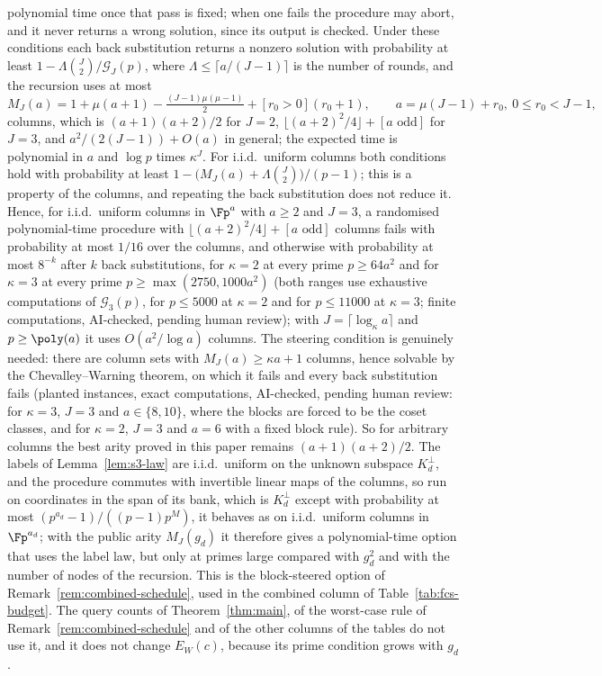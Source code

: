 \begin{remark}
polynomial time once that pass is fixed; when one fails the procedure may abort, and it never returns a wrong solution, since its output is checked. Under these conditions each back substitution returns a nonzero solution with probability at least $1-\Lambda\binom{J}{2}/\mathcal{G}_J(p)$, where $\Lambda\le\lceil a/(J-1)\rceil$ is the number of rounds, and the recursion uses at most
\[
  M_J(a)=1+\mu(a+1)-\tfrac{(J-1)\mu(\mu-1)}{2}+[r_0>0](r_0+1),\qquad a=\mu(J-1)+r_0,\ 0\le r_0<J-1,
\]
columns, which is $(a+1)(a+2)/2$ for $J=2$, $\lfloor(a+2)^2/4\rfloor+[a\text{ odd}]$ for $J=3$, and $a^2/(2(J-1))+O(a)$ in general; the expected time is polynomial in $a$ and $\log p$ times $\kappa^J$. For i.i.d.\ uniform columns both conditions hold with probability at least $1-\bigl(M_J(a)+\Lambda\binom{J}{2}\bigr)/(p-1)$; this is a property of the columns, and repeating the back substitution does not reduce it. Hence, for i.i.d.\ uniform columns in $\Fp^a$ with $a\ge2$ and $J=3$, a randomised polynomial-time procedure with $\lfloor(a+2)^2/4\rfloor+[a\text{ odd}]$ columns fails with probability at most $1/16$ over the columns, and otherwise with probability at most $8^{-k}$ after $k$ back substitutions, for $\kappa=2$ at every prime $p\ge64a^2$ and for $\kappa=3$ at every prime $p\ge\max(2750,1000a^2)$ (both ranges use exhaustive computations of $\mathcal{G}_3(p)$, for $p\le5000$ at $\kappa=2$ and for $p\le11000$ at $\kappa=3$; finite computations, AI-checked, pending human review); with $J=\lceil\log_\kappa a\rceil$ and $p\ge\poly(a)$ it uses $O(a^2/\log a)$ columns. The steering condition is genuinely needed: there are column sets with $M_J(a)\ge\kappa a+1$ columns, hence solvable by the Chevalley--Warning theorem, on which it fails and every back substitution fails (planted instances, exact computations, AI-checked, pending human review: for $\kappa=3$, $J=3$ and $a\in\{8,10\}$, where the blocks are forced to be the coset classes, and for $\kappa=2$, $J=3$ and $a=6$ with a fixed block rule). So for arbitrary columns the best arity proved in this paper remains $(a+1)(a+2)/2$. The labels of Lemma~\ref{lem:s3-law} are i.i.d.\ uniform on the unknown subspace $K_d^\perp$, and the procedure commutes with invertible linear maps of the columns, so run on coordinates in the span of its bank, which is $K_d^\perp$ except with probability at most $(p^{a_d}-1)/((p-1)p^{M})$, it behaves as on i.i.d.\ uniform columns in $\Fp^{a_d}$; with the public arity $M_J(g_d)$ it therefore gives a polynomial-time option that uses the label law, but only at primes large compared with $g_d^2$ and with the number of nodes of the recursion. This is the block-steered option of Remark~\ref{rem:combined-schedule}, used in the combined column of Table~\ref{tab:fcs-budget}. The query counts of Theorem~\ref{thm:main}, of the worst-case rule of Remark~\ref{rem:combined-schedule} and of the other columns of the tables do not use it, and it does not change $E_W(c)$, because its prime condition grows with $g_d$.
\end{remark}

